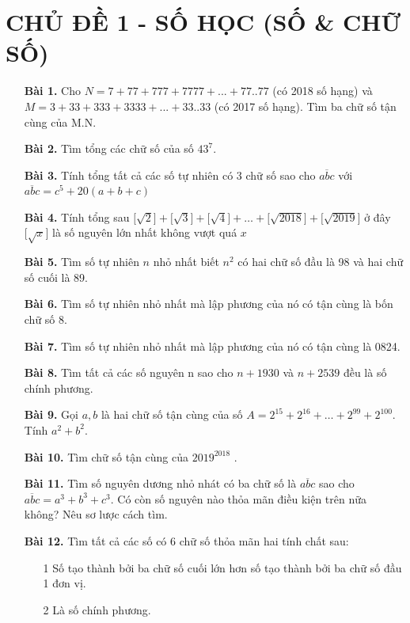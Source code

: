 \documentclass[12pt,a4paper]{article}
\begin{document}
\onehalfspacing
\newpage
\section*{CHỦ ĐỀ 1 - SỐ HỌC (SỐ \& CHỮ SỐ)}
\begin{enumerate}[label=\alph*.]
\item[\textbf{Bài 1.}] Cho $N= 7 + 77 + 777 + 7777 + ... + 77..77$ (có 2018 số hạng) và $M= 3 + 33 + 333 + 3333 + ... + 33..33$ (có 2017 số hạng). Tìm ba chữ số tận cùng của M.N.
\item[\textbf{Bài 2.}] Tìm tổng các chữ số của số $43^7$.
\item[\textbf{Bài 3.}] Tính tổng tất cả các số tự nhiên có 3 chữ số sao cho $\overline{abc}$ với $\overline{abc} = c^5 + 20(a+b+c)$
\item[\textbf{Bài 4.}] Tính tổng sau $\Big \lbrack \sqrt{2} \Big \rbrack + \Big \lbrack \sqrt{3} \Big \rbrack + \Big \lbrack \sqrt{4} \Big \rbrack + \ldots + \Big \lbrack \sqrt{2018} \Big \rbrack + \Big \lbrack \sqrt{2019} \Big \rbrack$ ở đây $\Big \lbrack \sqrt{x} \Big \rbrack$ là số nguyên lớn nhất không vượt quá $x$
\item[\textbf{Bài 5.}] Tìm số tự nhiên $n$ nhỏ nhất biết $n^2$ có hai chữ số đầu là 98 và hai chữ số cuối là 89.
\item[\textbf{Bài 6.}] Tìm số tự nhiên nhỏ nhất mà lập phương của nó có tận cùng là bốn chữ số 8.
\item[\textbf{Bài 7.}] Tìm số tự nhiên nhỏ nhất mà lập phương của nó có tận cùng là 0824.
\item[\textbf{Bài 8.}] Tìm tất cả các số nguyên n sao cho $n + 1930$ và $n + 2539$ đều là số chính phương.
\item[\textbf{Bài 9.}] Gọi $a,b$ là hai chữ số tận cùng của số $A = 2^{15} + 2^{16} + \ldots + 2^{99} + 2^{100}.$ Tính $a^2 + b^2$.
\item[\textbf{Bài 10.}] Tìm chữ số tận cùng của $2019^{2018}$ .
\item[\textbf{Bài 11.}] Tìm số nguyên dương nhỏ nhát có ba chữ số là $\overline{abc}$ sao cho $\overline{abc} = a^3 + b^3 + c^3$. Có còn số nguyên nào thỏa mãn điều kiện trên nữa không? Nêu sơ lược cách tìm.
\item[\textbf{Bài 12.}] Tìm tất cả các số có 6 chữ số thỏa mãn hai tính chất sau:
\begin{enumerate}
    \item[1] Số tạo thành bởi ba chữ số cuối lớn hơn số tạo thành bởi ba chữ số đầu 1 đơn vị.
    \item[2] Là số chính phương.

\end{enumerate}
\end{enumerate}
\end{document}
